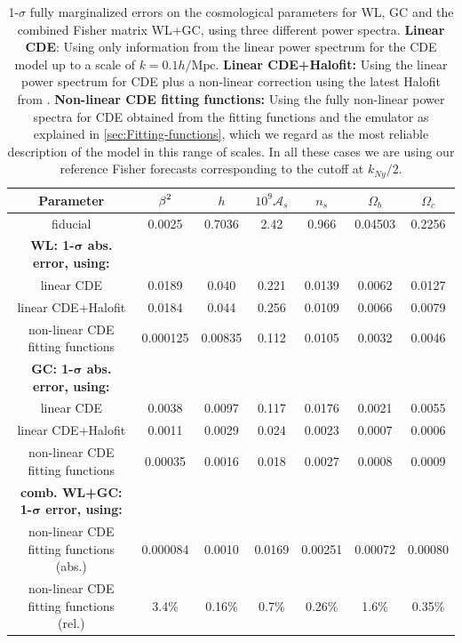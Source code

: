 \begin{table}
\footnotesize
\begin{centering}
\begin{tabular}{|c|c|c|c|c|c|c|}
\hline 
\textbf{Parameter}  & \textbf{$\text{\ensuremath{\beta}}^{2}$}  & $h$  & $10^{9}\mathcal{A}_{s}$  & $n_{s}$  & $\Omega_{b}$  & $\Omega_{c}$\tabularnewline
\hline 
fiducial  & 0.0025  & 0.7036  & 2.42  & 0.966  & 0.04503  & 0.2256\tabularnewline
\hline 
\textbf{WL: 1-$\mathbf{\sigma}$ abs. error, using:}  &  &  &  &  &  & \tabularnewline
\hline 
linear CDE  & 0.0189  & 0.040  & 0.221  & 0.0139  & 0.0062  & 0.0127\tabularnewline
linear CDE+Halofit  & 0.0184  & 0.044  & 0.256  & 0.0109  & 0.0066  & 0.0079\tabularnewline
non-linear CDE fitting functions  & 0.000125  & 0.00835  & 0.112  & 0.0105  & 0.0032  & 0.0046\tabularnewline
\hline 
\textbf{GC: 1-$\mathbf{\sigma}$ abs. error, using:}  &  &  &  &  &  & \tabularnewline
\hline 
linear CDE  & 0.0038  & 0.0097  & 0.117  & 0.0176  & 0.0021  & 0.0055\tabularnewline
linear CDE+Halofit  & 0.0011  & 0.0029  & 0.024  & 0.0023  & 0.0007  & 0.0006\tabularnewline
non-linear CDE fitting functions  & 0.00035  & 0.0016  & 0.018  & 0.0027  & 0.0008  & 0.0009\tabularnewline
\textbf{comb. WL+GC: 1-$\mathbf{\sigma}$ error, using:}  &  &  &  &  &  & \tabularnewline
\hline 
non-linear CDE fitting functions (abs.)  & 0.000084  & 0.0010  & 0.0169  & 0.00251  & 0.00072  & 0.00080 \tabularnewline
non-linear CDE fitting functions (rel.)  & 3.4\%  & 0.16\%  & 0.7\%  & 0.26\%  & 1.6\%  & 0.35\%\tabularnewline
\hline 
\end{tabular}
\par\end{centering}
\small
\caption[1$\sigma$ fully marginalized
errors for the CDE model, using WL, GC and the combined
Fisher matrix WL+GC, for three different power spectra.]{\label{tab:1-sigmaerrors-nl-WL-1-1} 1-$\sigma$ fully marginalized
errors on the cosmological parameters for WL, GC and the combined
Fisher matrix WL+GC, using three different power spectra. \textbf{Linear
CDE}: Using only information from the linear power spectrum for the
CDE model up to a scale of $k=0.1h/\mbox{Mpc}$. \textbf{Linear CDE+Halofit:
}Using the linear power spectrum for CDE plus a non-linear correction
using the latest Halofit from \cite{takahashi_revising_2012}. \textbf{Non-linear
CDE fitting functions: }Using the fully non-linear power spectra for
CDE obtained from the fitting functions and the emulator as explained
in \ref{sec:Fitting-functions}, which we regard as the most reliable
description of the model in this range of scales. In all these cases
we are using our reference Fisher forecasts corresponding to the cutoff
at $k_{Ny}/2$. }
\end{table}
\normalsize

